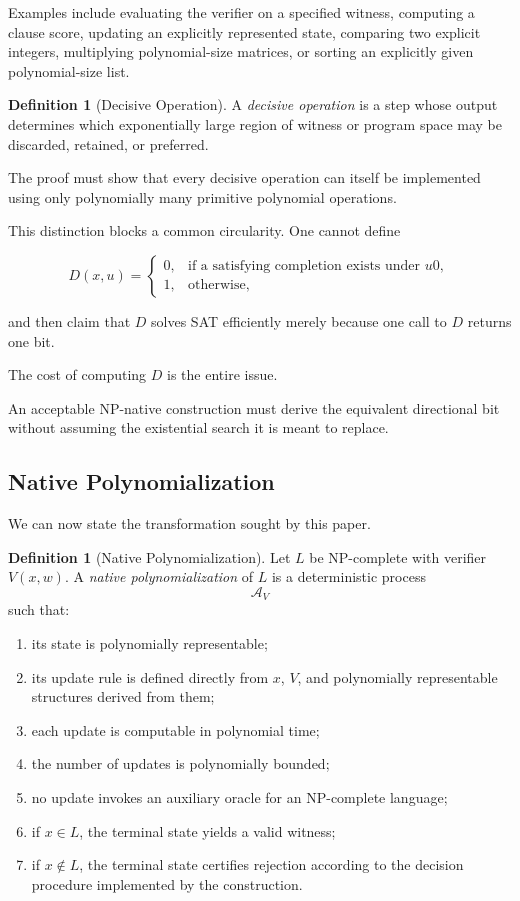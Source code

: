 \documentclass[11pt]{article}
\theoremstyle{plain}
\theoremstyle{definition}
\newtheorem{definition}[theorem]{Definition}
\begin{document}
Examples include evaluating the verifier on a specified witness, computing a
clause score, updating an explicitly represented state, comparing two explicit
integers, multiplying polynomial-size matrices, or sorting an explicitly
given polynomial-size list.

\begin{definition}[Decisive Operation]
A \emph{decisive operation} is a step whose output determines which
exponentially large region of witness or program space may be discarded,
retained, or preferred.
\end{definition}

The proof must show that every decisive operation can itself be implemented
using only polynomially many primitive polynomial operations.

This distinction blocks a common circularity.  One cannot define

\[
    D(x,u)
    =
    \begin{cases}
        0,&\text{if a satisfying completion exists under }u0,\\
        1,&\text{otherwise},
    \end{cases}
\]

and then claim that \(D\) solves SAT efficiently merely because one call to
\(D\) returns one bit.

The cost of computing \(D\) is the entire issue.

An acceptable NP-native construction must derive the equivalent directional
bit without assuming the existential search it is meant to replace.

\subsection{Native Polynomialization}

We can now state the transformation sought by this paper.

\begin{definition}[Native Polynomialization]
\label{def:native-polynomialization}
Let \(L\) be NP-complete with verifier \(V(x,w)\).  A
\emph{native polynomialization} of \(L\) is a deterministic process
\[
    \mathcal{A}_V
\]
such that:

\begin{enumerate}
    \item its state is polynomially representable;
    \item its update rule is defined directly from \(x\), \(V\), and
    polynomially representable structures derived from them;
    \item each update is computable in polynomial time;
    \item the number of updates is polynomially bounded;
    \item no update invokes an auxiliary oracle for an NP-complete language;
    \item if \(x\in L\), the terminal state yields a valid witness;
    \item if \(x\notin L\), the terminal state certifies rejection according
    to the decision procedure implemented by the construction.
\end{enumerate}
\end{definition}
\end{document}

